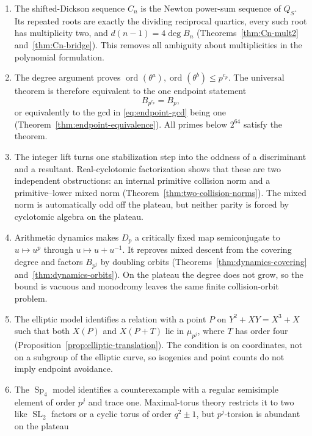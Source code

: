 \documentclass[a4paper]{article}
\newcommand{\ord}[2][]{\operatorname{ord}_{#1}\!\left(#2\right)}
\newcommand{\Sp}{\operatorname{Sp}}
\newcommand{\SL}{\operatorname{SL}}
\begin{document}
\begin{enumerate}
	\item The shifted-Dickson sequence $C_n$ is the Newton power-sum
	      sequence of $Q_S$.  Its repeated roots are exactly the dividing
	      reciprocal quartics, every such root has multiplicity two, and
	      $d(n-1)=4\deg B_n$ (Theorems~\ref{thm:Cn-mult2}
	      and~\ref{thm:Cn-bridge}).  This removes all ambiguity about
	      multiplicities in the polynomial formulation.
	\item The degree argument proves
	      $\ord{\theta^a},\ord{\theta^b}\leq p^{c_p}$.
	      The universal theorem is therefore equivalent to the one
	      endpoint statement
	      \[
		      B_{p^{c_p}}=B_p,
	      \]
	      or equivalently to the gcd in \eqref{eq:endpoint-gcd} being one
	      (Theorem~\ref{thm:endpoint-equivalence}).  All primes below
	      $2^{64}$ satisfy the theorem.
	\item The integer lift turns one stabilization step into the oddness
	      of a discriminant and a resultant.  Real-cyclotomic
	      factorization shows that these are two independent obstructions:
	      an internal primitive collision norm and a primitive--lower
	      mixed norm (Theorem~\ref{thm:two-collision-norms}).  The mixed
	      norm is automatically odd off the plateau, but neither parity is
	      forced by cyclotomic algebra on the plateau.
	\item Arithmetic dynamics makes $D_p$ a critically fixed map
	      semiconjugate to $u\mapsto u^p$ through
	      $u\mapsto u+u^{-1}$.  It reproves mixed descent from the covering
	      degree and factors $B_{p^j}$ by doubling orbits
	      (Theorems~\ref{thm:dynamics-covering}
	      and~\ref{thm:dynamics-orbits}).  On the plateau the degree does
	      not grow, so the bound is vacuous and monodromy leaves the same
	      finite collision-orbit problem.
	\item The elliptic model identifies a relation with a point $P$ on
	      $Y^2+XY=X^3+X$ such that both $X(P)$ and $X(P+T)$ lie in
	      $\mu_{p^j}$, where $T$ has order four
	      (Proposition~\ref{prop:elliptic-translation}).  The condition is
	      on coordinates, not on a subgroup of the elliptic curve, so
	      isogenies and point counts do not imply endpoint avoidance.
	\item The $\Sp_4$ model identifies a counterexample with a regular
	      semisimple element of order $p^j$ and trace one.  Maximal-torus
	      theory restricts it to two like $\SL_2$ factors or a cyclic torus
	      of order $q^2\pm1$, but $p^j$-torsion is abundant on the plateau

\end{enumerate}
\end{document}

